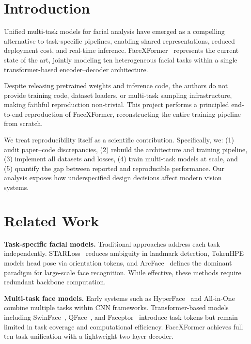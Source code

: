 \section{Introduction}

Unified multi-task models for facial analysis have emerged as a compelling alternative to task-specific pipelines, enabling shared representations, reduced deployment cost, and real-time inference. FaceXFormer~\cite{narayan2024facexformer} represents the current state of the art, jointly modeling ten heterogeneous facial tasks within a single transformer-based encoder--decoder architecture.

Despite releasing pretrained weights and inference code, the authors do not provide training code, dataset loaders, or multi-task sampling infrastructure, making faithful reproduction non-trivial. This project performs a principled end-to-end reproduction of FaceXFormer, reconstructing the entire training pipeline from scratch.

We treat reproducibility itself as a scientific contribution. Specifically, we: (1) audit paper--code discrepancies, (2) rebuild the architecture and training pipeline, (3) implement all datasets and losses, (4) train multi-task models at scale, and (5) quantify the gap between reported and reproducible performance. Our analysis exposes how underspecified design decisions affect modern vision systems.

\section{Related Work}

\textbf{Task-specific facial models.}
Traditional approaches address each task independently. STARLoss~\cite{zhou2023starloss} reduces ambiguity in landmark detection, TokenHPE~\cite{zhang2023tokenhpe} models head pose via orientation tokens, and ArcFace~\cite{deng2019arcface} defines the dominant paradigm for large-scale face recognition. While effective, these methods require redundant backbone computation.

\textbf{Multi-task face models.}
Early systems such as HyperFace~\cite{ranjan2017hyperface} and All-in-One~\cite{ranjan2017allinone} combine multiple tasks within CNN frameworks. Transformer-based models including SwinFace~\cite{qin2023swinface}, QFace~\cite{sun2024qface}, and Faceptor~\cite{qin2025faceptor} introduce task tokens but remain limited in task coverage and computational efficiency. FaceXFormer achieves full ten-task unification with a lightweight two-layer decoder.

